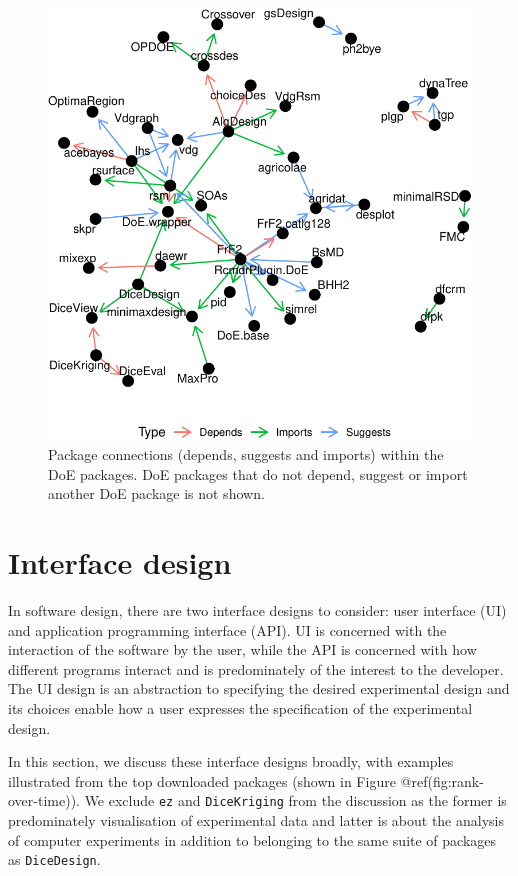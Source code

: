 \documentclass{article}
\begin{document}
\begin{figure}[htbp]

{\centering \includegraphics{figures/plot-doe-network-1} 

}

\caption{Package connections (depends, suggests and imports) within the DoE packages. DoE packages that do not depend, suggest or import another DoE package is not shown.}\label{fig:plot-doe-network}
\end{figure}

\hypertarget{design}{%
\section{Interface design}\label{design}}

In software design, there are two interface designs to consider: user
interface (UI) and application programming interface (API). UI is
concerned with the interaction of the software by the user, while the
API is concerned with how different programs interact and is
predominately of the interest to the developer. The UI design is an
abstraction to specifying the desired experimental design and its
choices enable how a user expresses the specification of the
experimental design.

In this section, we discuss these interface designs broadly, with
examples illustrated from the top downloaded packages (shown in Figure
@ref(fig:rank-over-time)). We exclude \texttt{ez} and
\texttt{DiceKriging} from the discussion as the former is predominately
visualisation of experimental data and latter is about the analysis of
computer experiments in addition to belonging to the same suite of
packages as \texttt{DiceDesign}.
\end{document}
